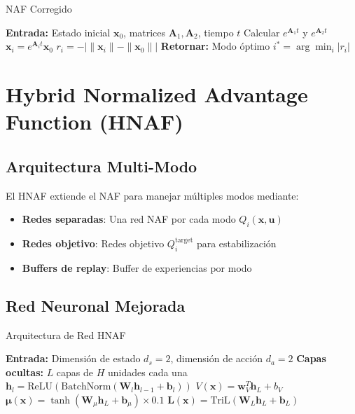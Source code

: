 \documentclass[12pt,a4paper]{article}
\begin{document}
\begin{algorithm}
\caption{NAF Corregido}
\begin{algorithmic}[1]
\STATE \textbf{Entrada:} Estado inicial $\mathbf{x}_0$, matrices $\mathbf{A}_1, \mathbf{A}_2$, tiempo $t$
\STATE Calcular $e^{\mathbf{A}_1 t}$ y $e^{\mathbf{A}_2 t}$
    \STATE $\mathbf{x}_i = e^{\mathbf{A}_i t} \mathbf{x}_0$
    \STATE $r_i = -|\|\mathbf{x}_i\| - \|\mathbf{x}_0\||$
\ENDFOR
\STATE \textbf{Retornar:} Modo óptimo $i^* = \arg\min_i |r_i|$
\end{algorithmic}
\end{algorithm}

\section{Hybrid Normalized Advantage Function (HNAF)}

\subsection{Arquitectura Multi-Modo}

El HNAF extiende el NAF para manejar múltiples modos mediante:

\begin{itemize}
\item \textbf{Redes separadas}: Una red NAF por cada modo $Q_i(\mathbf{x}, \mathbf{u})$
\item \textbf{Redes objetivo}: Redes objetivo $Q_i^{\text{target}}$ para estabilización
\item \textbf{Buffers de replay}: Buffer de experiencias por modo
\end{itemize}

\subsection{Red Neuronal Mejorada}

\begin{algorithm}
\caption{Arquitectura de Red HNAF}
\begin{algorithmic}[1]
\STATE \textbf{Entrada:} Dimensión de estado $d_s=2$, dimensión de acción $d_a=2$
\STATE \textbf{Capas ocultas:} $L$ capas de $H$ unidades cada una
    \STATE $\mathbf{h}_l = \text{ReLU}(\text{BatchNorm}(\mathbf{W}_l \mathbf{h}_{l-1} + \mathbf{b}_l))$
\ENDFOR
\STATE $V(\mathbf{x}) = \mathbf{w}_V^T \mathbf{h}_L + b_V$
\STATE $\boldsymbol{\mu}(\mathbf{x}) = \tanh(\mathbf{W}_\mu \mathbf{h}_L + \mathbf{b}_\mu) \times 0.1$
\STATE $\mathbf{L}(\mathbf{x}) = \text{TriL}(\mathbf{W}_L \mathbf{h}_L + \mathbf{b}_L)$
\end{algorithmic}
\end{algorithm}
\end{document}
